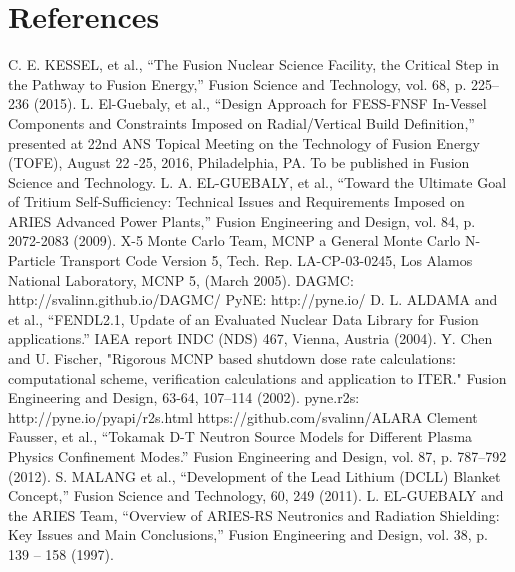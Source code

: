 \documentclass[12pt, letterpaper]{elsarticle}
\begin{document}
\section{References}
\begin{thebibliography}{13} 
C. E. KESSEL, et al., {“The Fusion Nuclear Science Facility, the Critical Step in the Pathway to Fusion Energy,” Fusion Science and Technology, vol. 68, p. 225–236 (2015).}
L. El-Guebaly, et al., {“Design Approach for FESS-FNSF In-Vessel Components and Constraints Imposed on Radial/Vertical Build Definition,” presented at 22nd ANS Topical Meeting on the Technology of Fusion Energy (TOFE), August 22 -25, 2016, Philadelphia, PA. To be published in Fusion Science and Technology.}
L. A. EL-GUEBALY, et al., {“Toward the Ultimate Goal of Tritium Self-Sufficiency: Technical Issues and Requirements Imposed on ARIES Advanced Power Plants,” Fusion Engineering and Design, vol. 84, p. 2072-2083 (2009).}
X-5 Monte Carlo Team, {MCNP a General Monte Carlo N-Particle Transport Code Version 5, Tech. Rep. LA-CP-03-0245, Los Alamos National Laboratory, MCNP 5, (March 2005).}
{DAGMC: http://svalinn.github.io/DAGMC/}
{PyNE: http://pyne.io/} 
D. L. ALDAMA and et al., {“FENDL2.1, Update of an Evaluated Nuclear Data Library for Fusion applications.” IAEA report INDC (NDS) 467, Vienna, Austria (2004).}
Y. Chen and U. Fischer, {"Rigorous MCNP based shutdown dose rate calculations: computational scheme, verification calculations and application to ITER." Fusion Engineering and Design, 63-64, 107–114 (2002).}
{pyne.r2s: http://pyne.io/pyapi/r2s.html}
{https://github.com/svalinn/ALARA}
Clement Fausser, et al., {“Tokamak D-T Neutron Source Models for Different Plasma Physics Confinement Modes.” Fusion Engineering and Design, vol. 87, p. 787–792 (2012).}
S. MALANG et al., {“Development of the Lead Lithium (DCLL) Blanket Concept,” Fusion Science and Technology, 60, 249 (2011).}
L. EL-GUEBALY and the ARIES Team, {“Overview of ARIES-RS Neutronics and Radiation Shielding: Key Issues and Main Conclusions,” Fusion Engineering and Design, vol. 38, p. 139 – 158 (1997).}
\end{thebibliography}
\end{document}
